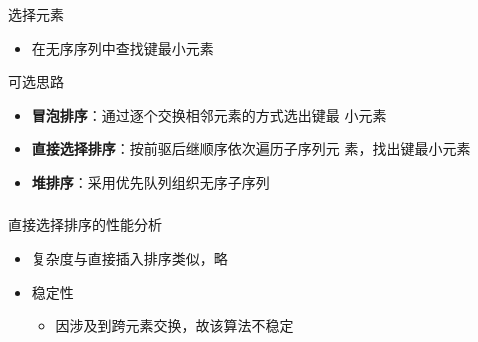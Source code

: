 \begin{frame}
    \frametitle{\insertsectionhead}
    \begin{block}{选择元素}
        \begin{itemize}
            \item 在\alert{无序序列}中\alert{查找}键最小元素
        \end{itemize}
    \end{block}
    \begin{block}{可选思路}
        \begin{itemize}
            \item \textbf{冒泡排序}：通过逐个交换相邻元素的方式\alert{选出}键最
                  小元素
            \item \textbf{直接选择排序}：按前驱后继顺序依次遍历子序列元
                  素，\alert{找出}键最小元素
            \item \textbf{堆排序}：采用\alert{优先队列}组织无序子序列
        \end{itemize}
    \end{block}
\end{frame}

\begin{frame}
    \frametitle{\insertsectionhead}
    \begin{block}{直接选择排序的性能分析}
        \begin{itemize}
            \item 复杂度与直接插入排序类似，略
            \item 稳定性
            \begin{itemize}
                \item 因涉及到跨元素交换，故该算法\alert{不稳定}
            \end{itemize}
        \end{itemize}
    \end{block}
\end{frame}

